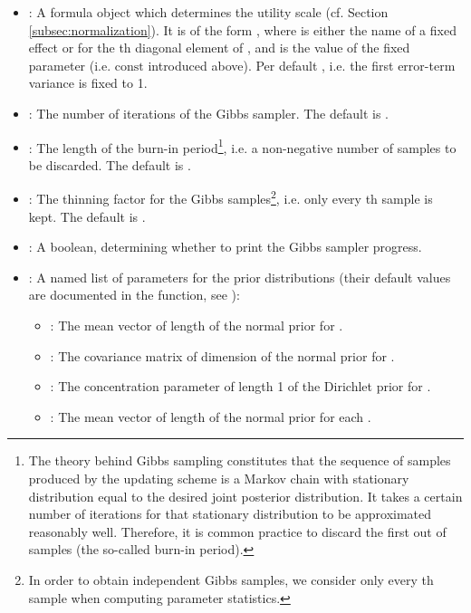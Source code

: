 \documentclass[article]{jss}
\newcommand{\fct}[1]{\code{#1()}}
\begin{document}
\begin{itemize}
  \item {}: A formula object which determines the utility scale (cf. Section \ref{subsec:normalization}). It is of the form , where  is either the name of a fixed effect or  for the th diagonal element of , and  is the value of the fixed parameter (i.e. $\text{const}$ introduced above). Per default , i.e. the first error-term variance is fixed to 1.
  \item {}: The number of iterations of the Gibbs sampler. The default is .
  \item {}: The length of the burn-in period\footnote{The theory behind Gibbs sampling constitutes that the sequence of samples produced by the
updating scheme is a Markov chain with stationary distribution equal to the desired joint posterior distribution. It takes a certain number of iterations for that stationary distribution to be approximated reasonably well. Therefore, it is common practice to discard the first  out of  samples (the so-called burn-in period).}, i.e. a non-negative number of samples to be discarded. The default is .
  \item {}: The thinning factor for the Gibbs samples\footnote{In order to obtain independent Gibbs samples, we consider only every th sample when computing parameter statistics.}, i.e. only every th sample is kept. The default is .
  \item {}: A boolean, determining whether to print the Gibbs sampler progress.
  \item {}: A named list of parameters for the prior distributions (their default values are documented in the \fct{check\_prior} function, see ):
  \begin{itemize}
    \item {}: The mean vector of length  of the normal prior for .
    \item {}: The covariance matrix of dimension  of the normal prior for .
    \item {}: The concentration parameter of length 1 of the Dirichlet prior for .
    \item {}: The mean vector of length  of the normal prior for each .

\end{itemize}
\end{itemize}
\end{document}
